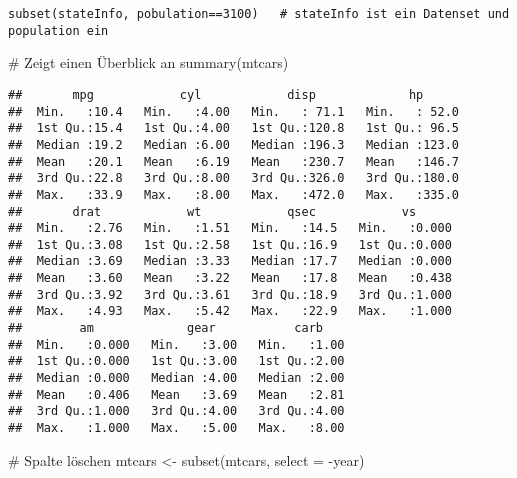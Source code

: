 \documentclass[]{article}
\newenvironment{Shaded}{\begin{snugshade}}{\end{snugshade}}
\newcommand{\KeywordTok}[1]{\textcolor[rgb]{0.94,0.87,0.69}{{#1}}}
\newcommand{\DataTypeTok}[1]{\textcolor[rgb]{0.87,0.87,0.75}{{#1}}}
\newcommand{\DecValTok}[1]{\textcolor[rgb]{0.86,0.86,0.80}{{#1}}}
\newcommand{\StringTok}[1]{\textcolor[rgb]{0.80,0.58,0.58}{{#1}}}
\newcommand{\CommentTok}[1]{\textcolor[rgb]{0.50,0.62,0.50}{{#1}}}
\newcommand{\NormalTok}[1]{\textcolor[rgb]{0.80,0.80,0.80}{{#1}}}
\begin{document}
\begin{verbatim}
subset(stateInfo, pobulation==3100)   # stateInfo ist ein Datenset und population ein
\end{verbatim}

\begin{Shaded}
\begin{Highlighting}[]
\CommentTok{# Zeigt einen Überblick an}
\KeywordTok{summary}\NormalTok{(mtcars)}
\end{Highlighting}
\end{Shaded}

\begin{verbatim}
##       mpg            cyl            disp             hp       
##  Min.   :10.4   Min.   :4.00   Min.   : 71.1   Min.   : 52.0  
##  1st Qu.:15.4   1st Qu.:4.00   1st Qu.:120.8   1st Qu.: 96.5  
##  Median :19.2   Median :6.00   Median :196.3   Median :123.0  
##  Mean   :20.1   Mean   :6.19   Mean   :230.7   Mean   :146.7  
##  3rd Qu.:22.8   3rd Qu.:8.00   3rd Qu.:326.0   3rd Qu.:180.0  
##  Max.   :33.9   Max.   :8.00   Max.   :472.0   Max.   :335.0  
##       drat            wt            qsec            vs       
##  Min.   :2.76   Min.   :1.51   Min.   :14.5   Min.   :0.000  
##  1st Qu.:3.08   1st Qu.:2.58   1st Qu.:16.9   1st Qu.:0.000  
##  Median :3.69   Median :3.33   Median :17.7   Median :0.000  
##  Mean   :3.60   Mean   :3.22   Mean   :17.8   Mean   :0.438  
##  3rd Qu.:3.92   3rd Qu.:3.61   3rd Qu.:18.9   3rd Qu.:1.000  
##  Max.   :4.93   Max.   :5.42   Max.   :22.9   Max.   :1.000  
##        am             gear           carb     
##  Min.   :0.000   Min.   :3.00   Min.   :1.00  
##  1st Qu.:0.000   1st Qu.:3.00   1st Qu.:2.00  
##  Median :0.000   Median :4.00   Median :2.00  
##  Mean   :0.406   Mean   :3.69   Mean   :2.81  
##  3rd Qu.:1.000   3rd Qu.:4.00   3rd Qu.:4.00  
##  Max.   :1.000   Max.   :5.00   Max.   :8.00
\end{verbatim}

\begin{Shaded}
\end{Shaded}

\begin{Shaded}
\begin{Highlighting}[]
\CommentTok{# Spalte löschen}
\NormalTok{mtcars <-}\StringTok{ }\KeywordTok{subset}\NormalTok{(mtcars, }\DataTypeTok{select =} \NormalTok{-year)}
\end{Highlighting}
\end{Shaded}
\end{document}
